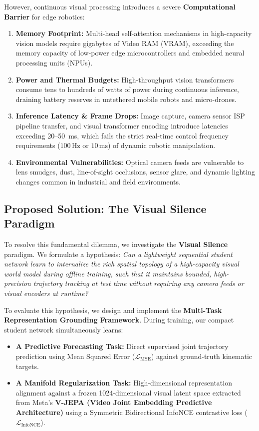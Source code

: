 \documentclass[11pt,a4paper]{article}
\begin{document}
However, continuous visual processing introduces a severe \textbf{Computational Barrier} for edge robotics:
\begin{enumerate}[label=(\roman*)]
    \item \textbf{Memory Footprint:} Multi-head self-attention mechanisms in high-capacity vision models require gigabytes of Video RAM (VRAM), exceeding the memory capacity of low-power edge microcontrollers and embedded neural processing units (NPUs).
    \item \textbf{Power and Thermal Budgets:} High-throughput vision transformers consume tens to hundreds of watts of power during continuous inference, draining battery reserves in untethered mobile robots and micro-drones.
    \item \textbf{Inference Latency \& Frame Drops:} Image capture, camera sensor ISP pipeline transfer, and visual transformer encoding introduce latencies exceeding 20--50~ms, which fails the strict real-time control frequency requirements ($100\,\text{Hz}$ or $10\,\text{ms}$) of dynamic robotic manipulation.
    \item \textbf{Environmental Vulnerabilities:} Optical camera feeds are vulnerable to lens smudges, dust, line-of-sight occlusions, sensor glare, and dynamic lighting changes common in industrial and field environments.
\end{enumerate}

\subsection{Proposed Solution: The Visual Silence Paradigm}
To resolve this fundamental dilemma, we investigate the \textbf{Visual Silence} paradigm. We formulate a hypothesis: \textit{Can a lightweight sequential student network learn to internalize the rich spatial topology of a high-capacity visual world model during offline training, such that it maintains bounded, high-precision trajectory tracking at test time without requiring any camera feeds or visual encoders at runtime?}

To evaluate this hypothesis, we design and implement the \textbf{Multi-Task Representation Grounding Framework}. During training, our compact student network simultaneously learns:
\begin{itemize}
    \item \textbf{A Predictive Forecasting Task:} Direct supervised joint trajectory prediction using Mean Squared Error ($\mathcal{L}_{\text{MSE}}$) against ground-truth kinematic targets.
    \item \textbf{A Manifold Regularization Task:} High-dimensional representation alignment against a frozen 1024-dimensional visual latent space extracted from Meta's \textbf{V-JEPA (Video Joint Embedding Predictive Architecture)} \cite{bardes2024vjepa} using a Symmetric Bidirectional InfoNCE contrastive loss ($\mathcal{L}_{\text{InfoNCE}}$).
\end{itemize}
\end{document}
